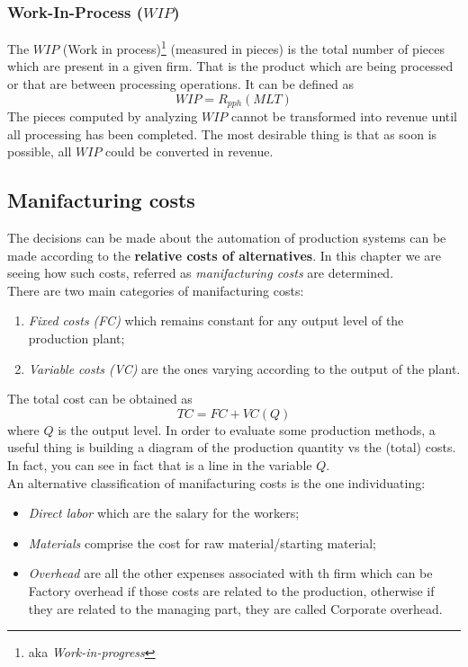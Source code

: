 \subsubsection{Work-In-Process ($WIP$)}
The $WIP$ (Work in process)\footnote{aka \textit{Work-in-progress}} (measured in pieces) is the total number of pieces which are present in a given firm. That is the product which are being processed or that are between processing operations. It can be defined as
\begin{equation}
    WIP=R_{pph} (MLT)
\end{equation} 
The pieces computed by analyzing $WIP$ cannot be transformed into revenue until all processing has been completed. The most desirable thing is that as soon is possible, all $WIP$ could be converted in revenue.

\subsection{\color{red} Manifacturing costs}
The decisions can be made about the automation of production systems can be made according to the \textbf{relative costs of alternatives}. In this chapter we are seeing how such costs, referred as \textit{manifacturing costs} are determined.\\
There are two main categories of manifacturing costs: 
\begin{enumerate}
    \itemsep-0.3em
    \item \textit{Fixed costs (FC)} which remains constant for any output level of the production plant; 
    \item \textit{Variable costs (VC)} are the ones varying according to the output of the plant.
\end{enumerate}
The total cost can be obtained as
\begin{equation}\label{eq:TC}
    TC=FC+VC(Q)
\end{equation}
where $Q$ is the output level. In order to evaluate some production methods, a useful thing is building a diagram of the production quantity vs the (total) costs. In fact, you can see in fact that  is a line in the variable $Q$.\\
\noindent
An alternative classification of manifacturing costs is the one individuating:
\begin{itemize}
    \itemsep-0.3em
    \item \textit{Direct labor} which are the salary for the workers; 
    \item \textit{Materials} comprise the cost for raw material/starting material; 
    \item \textit{Overhead} are all the other expenses associated with th firm which can be \textsf{Factory overhead} if those costs are related to the production, otherwise if they are related to the managing part, they are called \textsf{Corporate overhead}.
\end{itemize}

